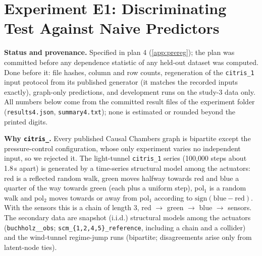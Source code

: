 \section{Experiment E1: Discriminating Test Against Naive Predictors}
\label{app:e1}

\textbf{Status and provenance.} Specified in plan 4 (\cref{app:prereg}); the plan was
committed before any dependence statistic of any held-out dataset was computed. Done
before it: file hashes, column and row counts, regeneration of the
\texttt{citris\_1} input protocol from its published generator (it matches the recorded inputs exactly),
graph-only predictions, and development runs on the study-3 data only. All numbers below come from the
committed result files of the experiment folder (\texttt{results4.json}, \texttt{summary4.txt}); none is estimated or rounded beyond the printed digits.

\textbf{Why \texttt{citris\_}.} Every published Causal Chambers graph is bipartite except the pressure-control
configuration, whose only experiment varies no independent input, so we rejected it. The light-tunnel
\texttt{citris\_1} series (100{,}000 steps about 1.8\,s apart) is generated by a time-series structural model among the actuators:
red is a reflected random walk, green moves halfway towards red and blue a quarter of the way towards green (each plus a uniform step),
pol$_1$ is a random walk and pol$_2$ moves towards or away from pol$_1$ according to $\mathrm{sign}(\mathrm{blue}-\mathrm{red})$.
With the sensors this is a chain of length 3, red $\to$ green $\to$ blue $\to$ sensors. The secondary data are
snapshot (i.i.d.) structural models among the actuators
(\texttt{buchholz\_\_\allowbreak obs}; \texttt{scm\_\allowbreak \{1,2,4,5\}\_\allowbreak reference}, including a chain and a collider)
and the wind-tunnel regime-jump runs (bipartite; disagreements arise only from latent-node ties).

